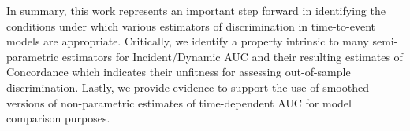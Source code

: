 \documentclass[useAMS,usenatbib, referee]{biom}
\begin{document}
In summary, this work represents an important step forward in identifying the conditions under which various estimators of discrimination in time-to-event models are appropriate. Critically, we identify a property intrinsic to many semi-parametric estimators for Incident/Dynamic AUC and their resulting estimates of Concordance which indicates their unfitness for assessing out-of-sample discrimination. Lastly, we provide evidence to support the use of smoothed versions of non-parametric estimates of time-dependent AUC for model comparison purposes.  







\end{document}
